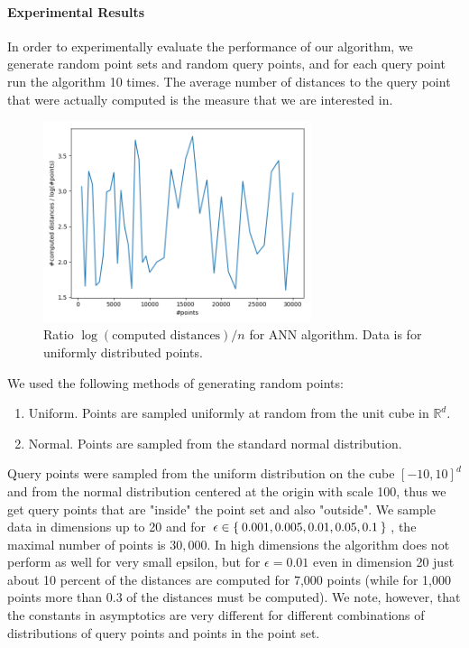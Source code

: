 \documentclass[a4paper,USenglish]{socg-lipics-v2018}
\newcommand{\R}{\mathbb{R}}
\newcommand{\eps}{\epsilon}
\begin{document}
\begin{algorithmic}
\paragraph{Experimental Results}

In order to experimentally evaluate the performance of our algorithm,
we generate random point sets and random query points, and for each query point
run the algorithm 10 times. The average number of distances to the query point
that were actually computed is the measure that we are interested in.

\begin{figure}[ht]
    \label{fig:ann_const_ratio}
    \includegraphics[width=0.7\textwidth]{log_dependency_constant_ratio.png}
    \caption{Ratio $\log(\mbox{computed distances}) / n$ for ANN algorithm. Data is for uniformly distributed
    points.}
\end{figure}


We used the following methods of generating random points:
\begin{enumerate}
    \item Uniform. Points are sampled uniformly at random from the unit cube in $\R^d$.
    \item Normal. Points are sampled from the standard normal distribution.
\end{enumerate}
Query points were sampled from the uniform distribution on the cube $[-10, 10]^d$
and from the normal distribution centered at the origin with scale 100,
thus we get query points that are "inside" the point set and also "outside".
We sample data in dimensions up to 20 and for $\eps \in \Set{0.001, 0.005, 0.01, 0.05, 0.1}$,
the maximal number of points is $30,000$.
In high dimensions the algorithm does not perform as well for very small epsilon,
but for $\eps = 0.01$ even in dimension 20 just about 10 percent of the distances
are computed for 7,000 points (while for 1,000 points more than 0.3 of the distances must be computed).
We note, however, that the constants in asymptotics are very different for different combinations
of distributions of query points and points in the point set.


\end{algorithmic}
\end{document}
